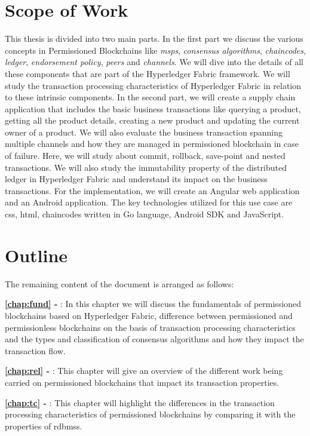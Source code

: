 \documentclass[
  a4paper,  %
  twoside,  %
  bibliography=totoc,
  headsepline,
  cleardoublepage=empty,
  parskip=half,
  draft=false
]{scrbook}
\begin{document}
\section{Scope of Work}
This thesis is divided into two main parts. In the first part we discuss the various concepts in Permissioned Blockchains like \textit{\glspl{msp}}, \textit{consensus algorithms}, \textit{chaincodes}, \textit{ledger}, \textit{endorsement policy}, \textit{peers} and \textit{channels}. We will dive into the details of all these components that are part of the Hyperledger Fabric framework. We will study the transaction processing characteristics of Hyperledger Fabric in relation to these intrinsic components. In the second part, we will create a supply chain application that includes the basic business transactions like querying a product, getting all the product details, creating a new product and updating the current owner of a product. We will also evaluate the business transaction spanning multiple channels and how they are managed in permissioned blockchain in case of failure. Here, we will study about commit, rollback, save-point and nested transactions. We will also study the immutability property of the distributed ledger in Hyperledger Fabric and understand its impact on the business transactions. For the implementation, we will create an Angular web application and an Android application. The key technologies utilized for this use case are \gls{css}, \gls{html}, chaincodes written in Go language, Android SDK and JavaScript.

\section{Outline}
The remaining content of the document is arranged as follows:

\textbf{\cref{chap:fund} - } : In this chapter we will discuss the fundamentals of permissioned blockchains based on Hyperledger Fabric, difference between permissioned and permissionless blockchains on the basis of transaction processing characteristics and the types and classification of consensus algorithms and how they impact the transaction flow.

\textbf{\cref{chap:rel} - } : This chapter will give an overview of the different work being carried on permissioned blockchains that impact its transaction properties.

\textbf{\cref{chap:tc} - } : This chapter will highlight the differences in the transaction processing characteristics of permissioned blockchains by comparing it with the properties of \glspl{rdbms}.
\end{document}
